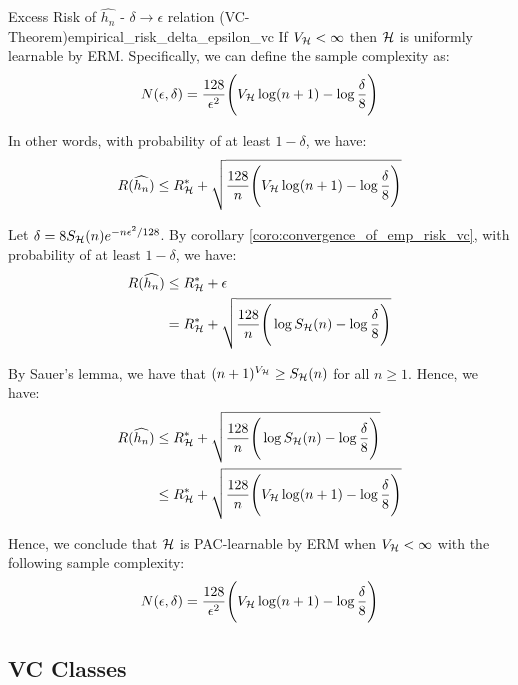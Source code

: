 \begin{corollary}{Excess Risk of $\widehat{h_n}$ - $\delta\to\epsilon$ relation (VC-Theorem)}{empirical_risk_delta_epsilon_vc}
    If $V_{\mathcal{H}} <\infty$ then $\mathcal{H}$ is uniformly learnable by ERM. Specifically, we can define the sample complexity as:
    \begin{align*}
        N(\epsilon, \delta) = \frac{128}{\epsilon^2}\Bigg( 
            V_{\mathcal{H}} \log(n+1) - \log\frac{\delta}{8}
         \Bigg)
    \end{align*}

    \noindent In other words, with probability of at least $1-\delta$, we have:
    \begin{align*}
        R(\widehat{h_n}) \le R_{\mathcal{H}}^* + \sqrt{
            \frac{128}{n}\Bigg( 
                V_{\mathcal{H}}\log(n+1) - \log\frac{\delta}{8}
             \Bigg)
        }
    \end{align*}
\end{corollary}

\begin{proof*}
    Let $\delta = 8S_{\mathcal{H}}(n)e^{-n\epsilon^2/128}$. By corollary \ref{coro:convergence_of_emp_risk_vc}, with probability of at least $1-\delta$, we have:
    \begin{align*}
        R(\widehat{h_n}) &\le R_{\mathcal{H}}^* + \epsilon \\
        &= R_{\mathcal{H}}^* + \sqrt{
            \frac{128}{n}\Bigg( 
                \log S_{\mathcal{H}}(n) - \log\frac{\delta}{8}
             \Bigg)
        }
    \end{align*}

    \noindent By Sauer's lemma, we have that $(n+1)^{V_{\mathcal{H}}}\ge S_{\mathcal{H}}(n)$ for all $n\ge 1$. Hence, we have:
    \begin{align*}
        R(\widehat{h_n}) &\le R_{\mathcal{H}}^* + \sqrt{
            \frac{128}{n}\Bigg( 
                \log S_{\mathcal{H}}(n) - \log\frac{\delta}{8}
             \Bigg)
        } \\
        &\le R_{\mathcal{H}}^* + \sqrt{
            \frac{128}{n}\Bigg( 
                V_{\mathcal{H}}\log(n+1) - \log\frac{\delta}{8}
             \Bigg)
        }
    \end{align*}

    \noindent\newline Hence, we conclude that $\mathcal{H}$ is PAC-learnable by ERM when $V_{\mathcal{H}}<\infty$ with the following sample complexity:
    \begin{align*}
        N(\epsilon, \delta) = \frac{128}{\epsilon^2}\Bigg( 
            V_{\mathcal{H}} \log(n+1) - \log\frac{\delta}{8}
         \Bigg)
    \end{align*}
\end{proof*}


\subsection{VC Classes}





